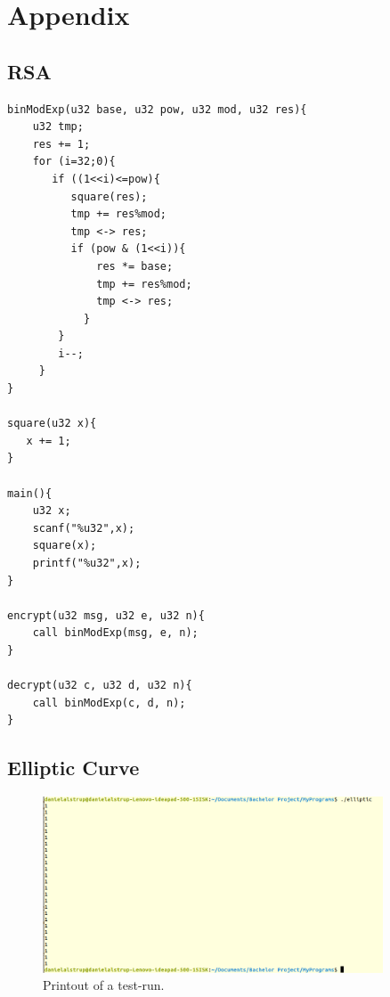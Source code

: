 

\chapter{Appendix}

\section{RSA}
\begin{Verbatim}[fontsize=\small]
binModExp(u32 base, u32 pow, u32 mod, u32 res){
    u32 tmp;
    res += 1;               
    for (i=32;0){           
       if ((1<<i)<=pow){
          square(res);        
          tmp += res%mod;     
          tmp <-> res;
          if (pow & (1<<i)){  
              res *= base;     
              tmp += res%mod;   
              tmp <-> res;
            }
        }
        i--;
     }
}

square(u32 x){
   x += 1;
}

main(){
    u32 x;
    scanf("%u32",x);
    square(x);
    printf("%u32",x);
}

encrypt(u32 msg, u32 e, u32 n){
    call binModExp(msg, e, n);
}

decrypt(u32 c, u32 d, u32 n){
    call binModExp(c, d, n);
}
\end{Verbatim}

\section{Elliptic Curve}



\begin{figure}[H]
\includegraphics[width=0.9\textwidth]{figures/Tests}
\caption{Printout of a test-run.}
\label{fig:ECCTest}
\end{figure}


